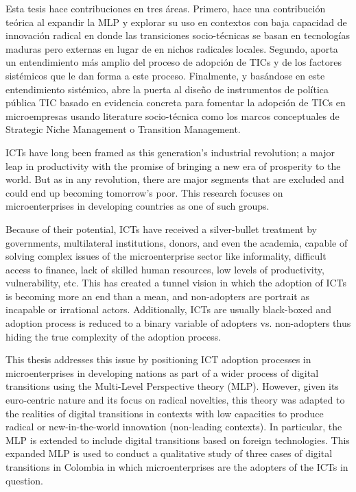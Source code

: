 \documentclass[10pt]{article}
\begin{document}
{Esta tesis hace contribuciones en tres áreas. Primero, hace una contribución teórica al expandir la MLP y explorar su uso en contextos con baja capacidad de innovación radical en donde las transiciones socio-técnicas se basan en tecnologías maduras pero externas en lugar de en nichos radicales locales. Segundo, aporta un entendimiento más amplio del proceso de adopción de TICs y de los factores sistémicos que le dan forma a este proceso. Finalmente, y basándose en este entendimiento sistémico, abre la puerta al diseño de instrumentos de política pública TIC basado en evidencia concreta para fomentar la adopción de TICs en microempresas usando literature socio-técnica como los marcos conceptuales de Strategic Niche Management o Transition Management.}
{ICTs have long been framed as this generation's industrial revolution; a major leap in productivity with the promise of bringing a new era of prosperity to the world. But as in any revolution, there are major segments that are excluded and could end up becoming tomorrow’s poor. This research focuses on microenterprises in developing countries as one of such groups.

Because of their potential, ICTs have received a silver-bullet treatment by governments, multilateral institutions, donors, and even the academia, capable of solving complex issues of the microenterprise sector like informality, difficult access to finance, lack of skilled human resources, low levels of productivity, vulnerability, etc. This has created a tunnel vision in which the adoption of ICTs is becoming more an end than a mean, and non-adopters are portrait as incapable or irrational actors. Additionally, ICTs are usually black-boxed and adoption process is reduced to a binary variable of adopters vs. non-adopters thus hiding the true complexity of the adoption process.

This thesis addresses this issue by positioning ICT adoption processes in microenterprises in developing nations as part of a wider process of digital transitions using the Multi-Level Perspective theory (MLP). However, given its euro-centric nature and its focus on radical novelties, this theory was adapted to the realities of digital transitions in contexts with low capacities to produce radical or new-in-the-world innovation (non-leading contexts). In particular, the MLP is extended to include digital transitions based on foreign technologies. This expanded MLP is used to conduct a qualitative study of three cases of digital transitions in Colombia in which microenterprises are the adopters of the ICTs in question.

}
\end{document}
